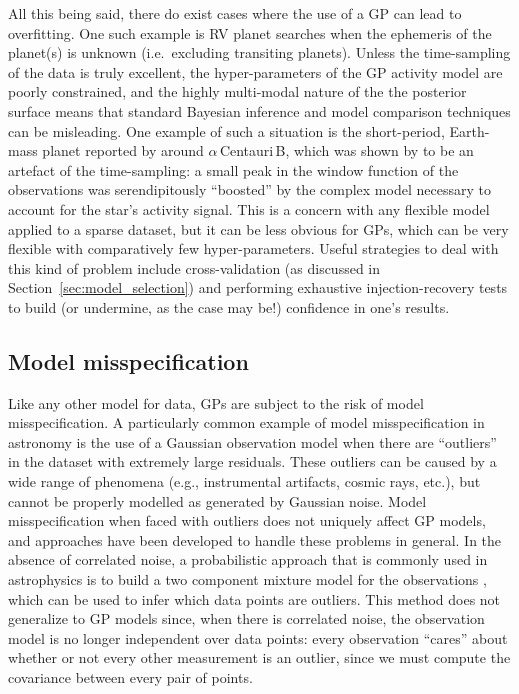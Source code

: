\documentclass[letterpaper]{ar-1col}
\begin{document}
All this being said, there do exist cases where the use of a GP can lead to overfitting. One such example is RV planet searches when the ephemeris of the planet(s) is unknown (i.e.\ excluding transiting planets). Unless the time-sampling of the data is truly excellent, the hyper-parameters of the GP activity model are poorly constrained, and the highly multi-modal nature of the the posterior surface means that standard Bayesian inference and model comparison techniques can be misleading. One example of such a situation is the short-period, Earth-mass planet reported by \citet{2012Natur.491..207D} around $\alpha$\,Centauri\,B, which was shown by \citet{2016MNRAS.456L...6R} to be an artefact of the time-sampling: a small peak in the window function of the observations was serendipitously ``boosted'' by the complex model necessary to account for the star's activity signal. This is a concern with any flexible model applied to a sparse dataset, but it can be less obvious for GPs, which can be very flexible with comparatively few hyper-parameters. Useful strategies to deal with this kind of problem include cross-validation (as discussed in Section~\ref{sec:model_selection}) and performing exhaustive injection-recovery tests to build (or undermine, as the case may be!) confidence in one's results. 

\subsection{Model misspecification}

Like any other model for data, GPs are subject to the risk of model misspecification.
A particularly common example of model misspecification in astronomy is the use of a Gaussian observation model when there are ``outliers'' in the dataset with extremely large residuals.
These outliers can be caused by a wide range of phenomena (e.g., instrumental artifacts, cosmic rays, etc.), but cannot be properly modelled as generated by Gaussian noise.
Model misspecification when faced with outliers does not uniquely affect GP models, and approaches have been developed to handle these problems in general.
In the absence of correlated noise, a probabilistic approach that is commonly used in astrophysics is to build a two component mixture model for the observations \citep[e.g.,][]{1997upa..conf...49P, 2010arXiv1008.4686H}, which can be used to infer which data points are outliers.
This method does not generalize to GP models since, when there is correlated noise, the observation model is no longer independent over data points:
every observation ``cares'' about whether or not every other measurement is an outlier, since we must compute the covariance between every pair of points.
\end{document}
